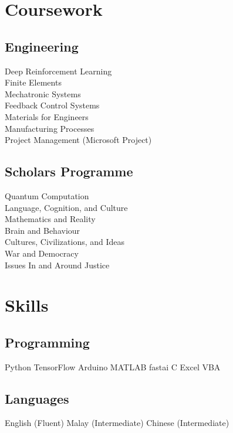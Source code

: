 \documentclass[]{deedy-resume-openfont}
\begin{document}
\begin{minipage}[t]{0.33\textwidth}

\section{Coursework}
\subsection{Engineering}
Deep Reinforcement Learning \\
Finite Elements \\
Mechatronic Systems \\
Feedback Control Systems \\
Materials for Engineers \\
Manufacturing Processes \\
Project Management (Microsoft Project) \\

\sectionsep

\subsection{Scholars Programme}
Quantum Computation \\
Language, Cognition, and Culture \\
Mathematics and Reality \\
Brain and Behaviour \\
Cultures, Civilizations, and Ideas \\
War and Democracy \\
Issues In and Around Justice \\


\section{Skills}
\subsection{Programming}
Python \textbullet{} TensorFlow \textbullet{} Arduino \textbullet{} MATLAB \textbullet{} fastai \textbullet{} C \textbullet{} Excel VBA \\
\sectionsep

\subsection{Languages}
English (Fluent) \textbullet{} Malay (Intermediate) \textbullet{} Chinese (Intermediate)\\
\sectionsep


\end{minipage}
\end{document}
